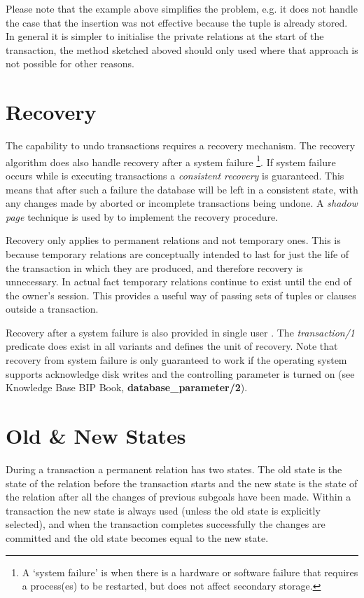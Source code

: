 Please note that the example above simplifies the problem, e.g. it
does not handle the case that the insertion was not effective because
the tuple is already stored. In general it is simpler to
initialise the private relations at the start of the transaction,
the method sketched aboved should only used where that approach
is not possible for other reasons.


\section{Recovery}

The capability to undo transactions requires a recovery mechanism.
The \eclipse recovery algorithm does also handle recovery after
a system failure
\footnote{A `system failure' is when there is a hardware or software 
failure that requires a process(es) to be restarted, but does not affect secondary storage.}.
If system failure occurs while \eclipse is executing transactions a 
{\em consistent recovery} is guaranteed. This means that after such 
a failure the database will be left in a consistent state,
with any changes made by aborted or incomplete transactions being undone.  
A {\em shadow page} technique is used by \eclipse to implement the 
recovery procedure.  

Recovery only applies to permanent relations and not temporary ones.  
This is because temporary relations are conceptually intended to last 
for just the life of the transaction in which they are produced, and 
therefore recovery is unnecessary.  In actual fact temporary relations
continue to exist until the end of the owner's \eclipse session. 
This provides a useful way of passing sets of tuples or clauses 
outside a transaction. 

Recovery after a system failure is also provided in single user \eclipse. 
The {\em transaction/1} predicate does exist in all variants and 
defines the unit of recovery.
Note that recovery from system failure is only guaranteed to work if
the operating system supports acknowledge disk writes and the
controlling \eclipse parameter is turned on (see Knowledge Base BIP Book,
{\bf database_parameter/2}).

\section{Old \& New States}

During a transaction a permanent relation has two states. 
The old state is the state of the relation before the transaction starts 
and the new state is the state of the relation
after all the changes of previous subgoals have been made. 
Within a transaction the new
state is always used (unless the old state is explicitly selected), and when 
the transaction completes successfully the changes are 
committed and the old state becomes equal to the new state.

